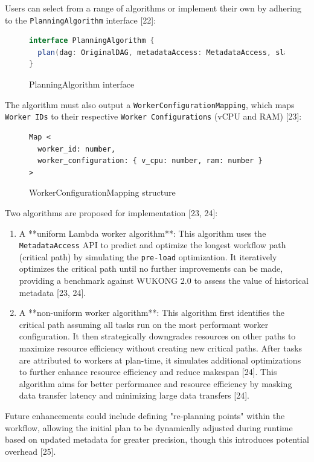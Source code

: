 \documentclass[conference]{IEEEtran}
\begin{document}
Users can select from a range of algorithms or implement their own by adhering to the \texttt{PlanningAlgorithm} interface [22]:
\begin{figure}[h]
\centering
\begin{lstlisting}[language=Java, basicstyle=\ttfamily\footnotesize, columns=fullflexible, breaklines=true]
interface PlanningAlgorithm {
  plan(dag: OriginalDAG, metadataAccess: MetadataAccess, sla: median | percentile_value | avg): Tuple <AnnotatedDAG, WorkerConfigurationMapping>
}
\end{lstlisting}
\caption{PlanningAlgorithm interface}
\label{lst:planning_algorithm}
\end{figure}
The algorithm must also output a \texttt{WorkerConfigurationMapping}, which maps \texttt{Worker IDs} to their respective \texttt{Worker Configurations} (vCPU and RAM) [23]:
\begin{figure}[h]
\centering
\begin{lstlisting}[basicstyle=\ttfamily\footnotesize, columns=fullflexible, breaklines=true]
Map <
  worker_id: number,
  worker_configuration: { v_cpu: number, ram: number }
>
\end{lstlisting}
\caption{WorkerConfigurationMapping structure}
\label{lst:worker_configuration_mapping}
\end{figure}
Two algorithms are proposed for implementation [23, 24]:
\begin{enumerate}
    \item A **uniform Lambda worker algorithm**: This algorithm uses the \texttt{MetadataAccess} API to predict and optimize the longest workflow path (critical path) by simulating the \texttt{pre-load} optimization. It iteratively optimizes the critical path until no further improvements can be made, providing a benchmark against WUKONG 2.0 to assess the value of historical metadata [23, 24].
    \item A **non-uniform worker algorithm**: This algorithm first identifies the critical path assuming all tasks run on the most performant worker configuration. It then strategically downgrades resources on other paths to maximize resource efficiency without creating new critical paths. After tasks are attributed to workers at plan-time, it simulates additional optimizations to further enhance resource efficiency and reduce makespan [24]. This algorithm aims for better performance and resource efficiency by masking data transfer latency and minimizing large data transfers [24].
\end{enumerate}
Future enhancements could include defining "re-planning points" within the workflow, allowing the initial plan to be dynamically adjusted during runtime based on updated metadata for greater precision, though this introduces potential overhead [25].
\end{document}
